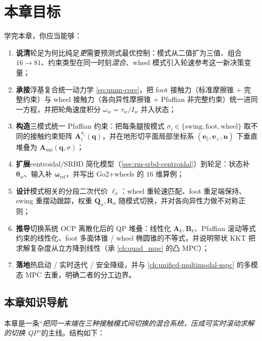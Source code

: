 \section*{本章目标}
学完本章，你应当能够：
\begin{enumerate}
  \item \textbf{说清}轮足为何比纯足\emph{更}需要预测式最优控制：模式从二值扩为三值、组合 $16\!\to\!81$、约束类型在同一时刻\emph{混合}、wheel 模式引入轮速参考这一新决策变量；
  \item \textbf{承接}浮基复合统一动力学 \cref{eq:umm-core}，把 foot 接触力（标准摩擦锥 + 完整约束）与 wheel 接触力（各向异性摩擦锥 + Pfaffian 非完整约束）统一进同一方程，并把轮角速度积分 $\dot\omega_w=\tau_w/I_w$ 并入状态；
  \item \textbf{构造}三模式统一 Pfaffian 约束：把每条腿按模式 $\sigma_i\in\{\mathrm{swing},\mathrm{foot},\mathrm{wheel}\}$ 取不同的接触约束矩阵 $\mathbf{A}_i^{\sigma_i}(\mathbf{q})$，并在地形切平面局部坐标系 $(\mathbf{e}_\parallel,\mathbf{e}_\perp,\mathbf{n})$ 下垂直堆叠为 $\mathbf{A}_{\mathrm{uni}}(\mathbf{q},\sigma)$；
  \item \textbf{扩展}centroidal/SRBD 简化模型（\cref{sec:rm-srbd-centroidal}）到轮足：状态补 $\boldsymbol\theta_w$、输入补 $\boldsymbol\omega_{\mathrm{ref}}$，并写出 Go2+wheels 的 $16$ 维算例；
  \item \textbf{设计}模式相关的分段二次代价 $\ell_\sigma$：wheel 重轮速匹配、foot 重足端保持、swing 重摆动跟踪，权重 $\mathbf{Q}_\sigma,\mathbf{R}_\sigma$ 随模式切换，并对各向异性力做不对称正则；
  \item \textbf{推导}切换系统 OCP 离散化后的 QP 堆叠：线性化 $\mathbf{A}_k,\mathbf{B}_k$、Pfaffian 滚动等式约束的线性化、foot 多面体锥 / wheel 椭圆锥的不等式，并说明带状 KKT 把求解复杂度从立方降到线性（承 \cref{ch:quad_mpc} 的凸 MPC）；
  \item \textbf{落地}热启动 / 实时迭代 / 安全降级，并与 \cref{ch:unified-multimodal-mpc} 的多模态 MPC 去重，明确二者的分工边界。
\end{enumerate}

\subsection*{本章知识导航}
本章是一条“\emph{把同一末端在三种接触模式间切换的混合系统，压成可实时滚动求解的切换 QP}”的主线。结构如下：


